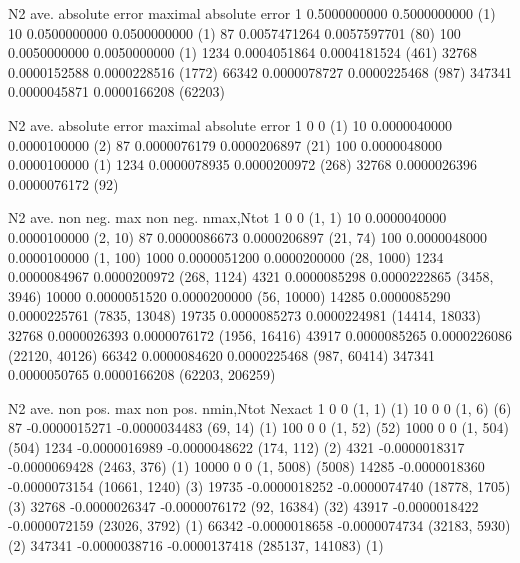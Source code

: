 \bye


N2      ave. absolute error maximal absolute error
1       0.5000000000        0.5000000000 (1)
10      0.0500000000        0.0500000000 (1)
87      0.0057471264        0.0057597701 (80)
100     0.0050000000        0.0050000000 (1)
1234    0.0004051864        0.0004181524 (461)
32768   0.0000152588        0.0000228516 (1772)
66342   0.0000078727        0.0000225468 (987)
347341  0.0000045871        0.0000166208 (62203)


N2      ave. absolute error maximal absolute error
1       0                   0            (1)
10      0.0000040000        0.0000100000 (2)
87      0.0000076179        0.0000206897 (21)
100     0.0000048000        0.0000100000 (1)
1234    0.0000078935        0.0000200972 (268)
32768   0.0000026396        0.0000076172 (92)           


N2     ave. non neg.   max non neg. nmax,Ntot      
1      0               0            (1, 1)          
10     0.0000040000    0.0000100000 (2, 10)         
87     0.0000086673    0.0000206897 (21, 74)        
100    0.0000048000    0.0000100000 (1, 100)        
1000   0.0000051200    0.0000200000 (28, 1000)      
1234   0.0000084967    0.0000200972 (268, 1124)     
4321   0.0000085298    0.0000222865 (3458, 3946)    
10000  0.0000051520    0.0000200000 (56, 10000)     
14285  0.0000085290    0.0000225761 (7835, 13048)   
19735  0.0000085273    0.0000224981 (14414, 18033)
32768  0.0000026393    0.0000076172 (1956, 16416)   
43917  0.0000085265    0.0000226086 (22120, 40126)  
66342  0.0000084620    0.0000225468 (987, 60414)    
347341 0.0000050765    0.0000166208 (62203, 206259)  

N2      ave. non pos.  max non pos.  nmin,Ntot    Nexact    
1       0              0            (1, 1)           (1)   
10      0              0            (1, 6)           (6)   
87     -0.0000015271  -0.0000034483 (69, 14)         (1)   
100     0              0            (1, 52)          (52)  
1000    0              0            (1, 504)         (504) 
1234   -0.0000016989  -0.0000048622 (174, 112)       (2)   
4321   -0.0000018317  -0.0000069428 (2463, 376)      (1)   
10000   0              0            (1, 5008)        (5008)
14285  -0.0000018360  -0.0000073154 (10661, 1240)    (3)   
19735  -0.0000018252  -0.0000074740 (18778, 1705)    (3)
32768  -0.0000026347  -0.0000076172 (92, 16384)      (32)  
43917  -0.0000018422  -0.0000072159 (23026, 3792)    (1)   
66342  -0.0000018658  -0.0000074734 (32183, 5930)    (2)   
347341 -0.0000038716  -0.0000137418 (285137, 141083) (1)   
